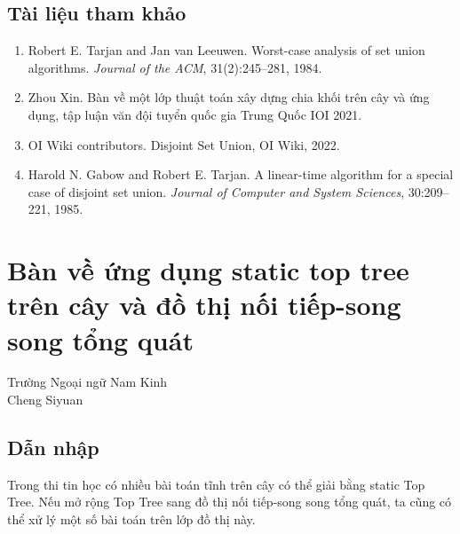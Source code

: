 \documentclass[11pt]{article}
\begin{document}
\subsection{Tài liệu tham khảo}

\begin{enumerate}
  \item Robert E. Tarjan and Jan van Leeuwen. Worst-case analysis of set union
  algorithms. \emph{Journal of the ACM}, 31(2):245--281, 1984.
  \item Zhou Xin. Bàn về một lớp thuật toán xây dựng chia khối trên cây và ứng
  dụng, tập luận văn đội tuyển quốc gia Trung Quốc IOI 2021.
  \item OI Wiki contributors. Disjoint Set Union, OI Wiki, 2022.
  \item Harold N. Gabow and Robert E. Tarjan. A linear-time algorithm for a
  special case of disjoint set union. \emph{Journal of Computer and System
  Sciences}, 30:209--221, 1985.
\end{enumerate}

\section{Bàn về ứng dụng static top tree trên cây và đồ thị nối tiếp-song song tổng quát}

\begin{center}
Trường Ngoại ngữ Nam Kinh\\
Cheng Siyuan
\end{center}

\renewcommand{\abstractname}{Tóm tắt}
\begin{abstract}
Bài viết giới thiệu khái niệm static Top Tree; trình bày ba ứng dụng trên bài
toán cây: duy trì thông tin bằng thao tác pushup trên Top Tree, chia để trị
trên các đỉnh của Top Tree, và dùng Top Tree để xây dựng phân khối cây. Sau đó
bài viết mở rộng hai ứng dụng đầu sang đồ thị nối tiếp-song song tổng quát, và
đề xuất một cách xây dựng phân khối cho lớp đồ thị này dựa trên Top Tree.
\end{abstract}

\subsection{Dẫn nhập}

Trong thi tin học có nhiều bài toán tĩnh trên cây có thể giải bằng static Top
Tree. Nếu mở rộng Top Tree sang đồ thị nối tiếp-song song tổng quát, ta cũng có
thể xử lý một số bài toán trên lớp đồ thị này.
\end{document}
